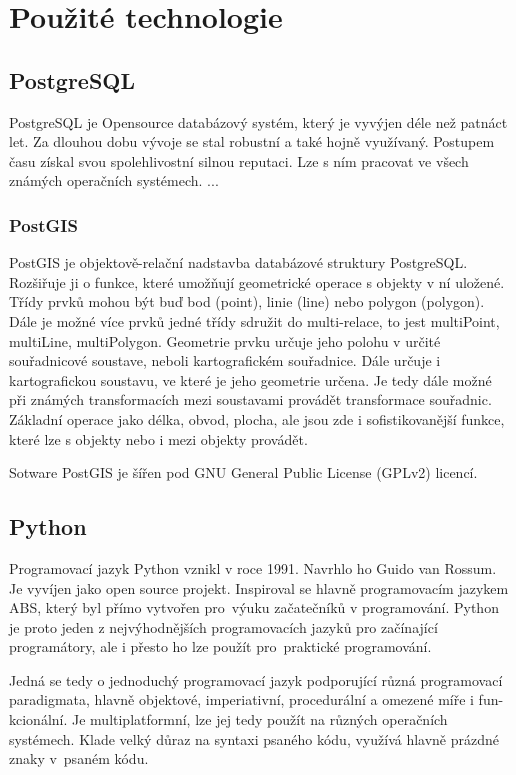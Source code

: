\chapter{Použité technologie}
\label{3-technologie}

\section{PostgreSQL}
\label{PostgreSQL}
PostgreSQL je Opensource databázový systém, který je vyvýjen déle než patnáct
let. Za dlouhou dobu vývoje se stal robustní a také hojně využívaný.
Postupem času získal svou spolehlivostní silnou reputaci.
Lze s ním pracovat ve všech známých operačních systémech. 
...
\cite{PostgreSQL}

\subsection{PostGIS}
\label{PostGIS}
PostGIS je objektově-relační nadstavba databázové struktury PostgreSQL.
Rozšiřuje ji o funkce, které umožňují geometrické operace s objekty v ní uložené.
Třídy prvků mohou být buď bod (point), linie (line) nebo polygon (polygon).
Dále je možné více prvků jedné třídy sdružit do multi-relace, 
to jest  multiPoint, multiLine, multiPolygon.
Geometrie prvku určuje jeho polohu v určité souřadnicové soustave, neboli 
kartografickém souřadnice. Dále určuje i kartografickou soustavu, ve které je 
jeho geometrie určena. Je tedy dále možné při známých transformacích mezi
soustavami provádět transformace souřadnic. Základní operace jako délka, obvod,
plocha, ale jsou zde i sofistikovanější funkce, které lze s objekty nebo i mezi 
objekty provádět.

Sotware PostGIS je šířen pod GNU General Public License (GPLv2) licencí.


\section{Python}
\label{Python}
Programovací jazyk Python vznikl v roce 1991. Navrhlo ho Guido van Rossum. 
Je vyvíjen jako open source projekt. Inspiroval se hlavně programovacím jazykem
ABS, který byl přímo vytvořen pro~výuku začatečníků v programování. Python je 
proto jeden z nejvýhodnějších programovacích jazyků pro začínající programátory,
ale i přesto ho lze použít pro~praktické programování. 

Jedná se tedy o jednoduchý programovací jazyk podporující různá programovací 
paradigmata, hlavně objektové, imperiativní, procedurální a omezené míře i 
fun- kcionální. Je multiplatformní, lze jej tedy použít na různých operačních 
systémech. Klade velký důraz na syntaxi psaného kódu, využívá hlavně prázdné 
znaky v~psaném kódu.  

